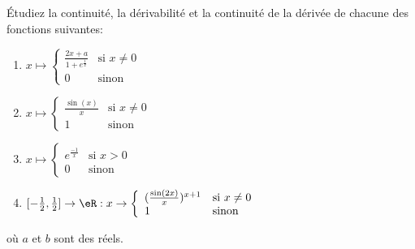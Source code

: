 
\begin{exercice}\label{exo0036}

Étudiez la continuité, la dérivabilité et la continuité de la dérivée de chacune des fonctions suivantes:
\begin{enumerate}
\item $x \mapsto \left\{ \begin{array}{ll} \frac{2x+a}{1+e^{\frac{1}{x}}} & \mbox{si } x \not= 0 \\ 0 & \mbox{sinon} \end{array} \right.  $
\item $x \mapsto \left\{ \begin{array}{ll} \frac{\sin(x)}{x} & \mbox{si } x \not= 0 \\ 1 & \mbox{sinon} \end{array} \right. $
\item $x \mapsto \left\{ \begin{array}{ll} e^{\frac{-1}{x}} & \mbox{si } x > 0 \\ 0 & \mbox{sinon} \end{array} \right. $
\item $[-\frac{1}{2}, \frac{1}{2}] \rightarrow \eR: x \rightarrow \left\{ \begin{array}{ll} (\frac{\sin(2x)}{x})^{x+1} & \mbox{si } x \not= 0 \\ 1 & \mbox{sinon} \end{array} \right. $
\end{enumerate}
où $a$ et $b$ sont des réels.



\end{exercice}
